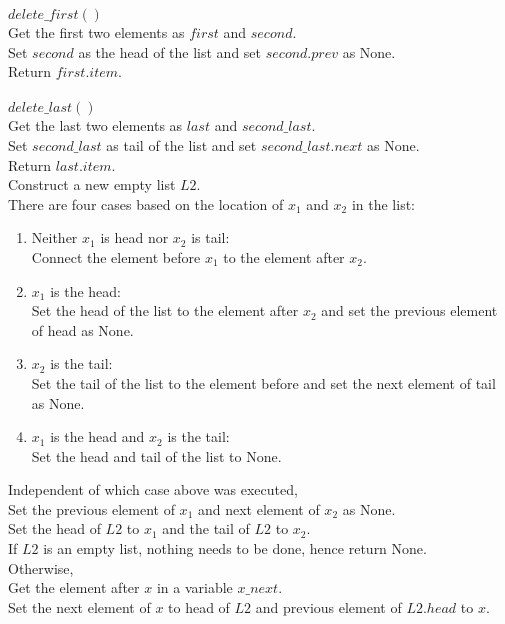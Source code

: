 \documentclass[12pt,twoside]{article}
\begin{document}
\begin{problems}
\begin{problemparts}
$delete\_first()$ \\
Get the first two elements as $first$ and $second$. \\
Set $second$ as the head of the list and set $second.prev$ as None. \\
Return $first.item$. \\ \\ 

$delete\_last()$ \\
Get the last two elements as $last$ and $second\_last$. \\
Set $second\_last$ as tail of the list and set $second\_last.next$ as None. \\
Return $last.item$. \\

\newpage
\problempart %
Construct a new empty list $L2$. \\
There are four cases based on the location of $x_1$ and $x_2$ in the list: \\
\begin{enumerate}
    \item Neither $x_1$ is head nor $x_2$ is tail: \\
    \hspace*{3em} Connect the element before $x_1$ to the element after $x_2$.
    \item $x_1$ is the head: \\
    \hspace*{3em} Set the head of the list to the element after $x_2$ and set the previous element of head as None.
    \item $x_2$ is the tail: \\
    \hspace*{3em} Set the tail of the list to the element before and set the next element of tail as None.
    \item $x_1$ is the head and $x_2$ is the tail: \\
    \hspace*{3em} Set the head and tail of the list to None.
\end{enumerate}

Independent of which case above was executed, \\
Set the previous element of $x_1$ and next element of $x_2$ as None. \\
Set the head of $L2$ to $x_1$ and the tail of $L2$ to $x_2$. \\

\problempart %
If $L2$ is an empty list, nothing needs to be done, hence return None. \\
Otherwise, \\
Get the element after $x$ in a variable $x\_next$. \\
Set the next element of $x$ to head of $L2$ and previous element of $L2.head$ to $x$. \\


\end{problemparts}
\end{problems}
\end{document}
